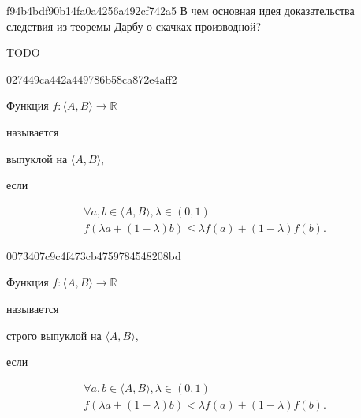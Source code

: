 \begin{note}{f94b4bdf90b14fa0a4256a492cf742a5}
    В чем основная идея доказательства следствия из теоремы Дарбу о скачках производной?

    TODO
\end{note}

\begin{note}{027449ca442a449786b58ca872e4aff2}
    \begin{icloze}{3}Функция \( f : \langle A, B \rangle \to \mathbb R  \)\end{icloze} называется \begin{icloze}{2}выпуклой на \( \langle A, B \rangle  \),\end{icloze} если
    \begin{icloze}{1}\[
        \begin{gathered}
            \forall a, b \in \langle A, B \rangle, \lambda \in (0,1) \\
            f(\lambda a + (1 - \lambda)b) \leqslant \lambda f(a) + (1 - \lambda)f(b).
        \end{gathered}
    \]\end{icloze}
\end{note}

\begin{note}{0073407c9c4f473cb4759784548208bd}
    \begin{icloze}{3}Функция \( f : \langle A, B \rangle \to \mathbb R  \)\end{icloze} называется \begin{icloze}{2}строго выпуклой на \( \langle A, B \rangle  \),\end{icloze} если
    \begin{icloze}{1}\[
        \begin{gathered}
            \forall a, b \in \langle A, B \rangle, \lambda \in (0,1) \\
            f(\lambda a + (1 - \lambda)b) < \lambda f(a) + (1 - \lambda)f(b).
        \end{gathered}
    \]\end{icloze}
\end{note}

